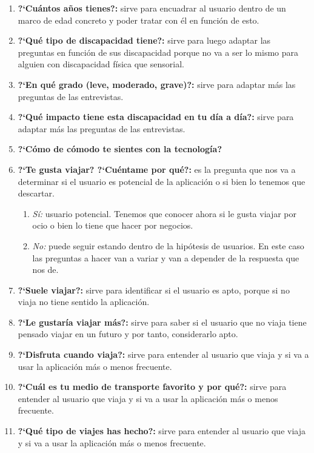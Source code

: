 \begin{enumerate}
    \item {\textbf{?`Cuántos años tienes?:}} sirve para encuadrar al usuario dentro de un marco de edad concreto y poder tratar con él en función de esto.
    \item {\textbf{?`Qué tipo de discapacidad tiene?:}} sirve para luego adaptar las preguntas en función de sus discapacidad porque no va a ser lo
                mismo para alguien con discapacidad física que sensorial.
    \item {\textbf{?`En qué grado (leve, moderado, grave)?:}} sirve para adaptar más las preguntas de las entrevistas.
    \item {\textbf{?`Qué impacto tiene esta discapacidad en tu día a día?:}} sirve para adaptar más las preguntas de las entrevistas.
    \item {\textbf{?`Cómo de cómodo te sientes con la tecnología?}}
    \item {\textbf{?`Te gusta viajar? ?`Cuéntame por qué?:}} es la pregunta que nos va a determinar si el usuario es potencial de la aplicación
                o si bien lo tenemos que descartar.
    \begin{enumerate}
        \item {\textit{Sí:}} usuario potencial. Tenemos que conocer ahora si le gusta viajar por ocio o bien lo tiene que hacer por negocios.
        \item {\textit{No:}} puede seguir estando dentro de la hipótesis de usuarios. En este caso las preguntas a hacer van a variar y van a
                        depender de la respuesta que nos de.
    \end{enumerate}
    \item {\textbf{?`Suele viajar?:}} sirve para identificar si el usuario es apto, porque si no viaja no tiene sentido la aplicación.
    \item {\textbf{?`Le gustaría viajar más?:}} sirve para saber si el usuario que no viaja tiene pensado viajar en un futuro y por tanto, considerarlo apto.
    \item {\textbf{?`Disfruta cuando viaja?:}} sirve para entender al usuario que viaja y si va a usar la aplicación más o menos frecuente.
    \item {\textbf{?`Cuál es tu medio de transporte favorito y por qué?:}} sirve para entender al usuario que viaja y si va a usar la aplicación más o menos frecuente.
    \item {\textbf{?`Qué tipo de viajes has hecho?:}} sirve para entender al usuario que viaja y si va a usar la aplicación más o menos frecuente.

\end{enumerate}
